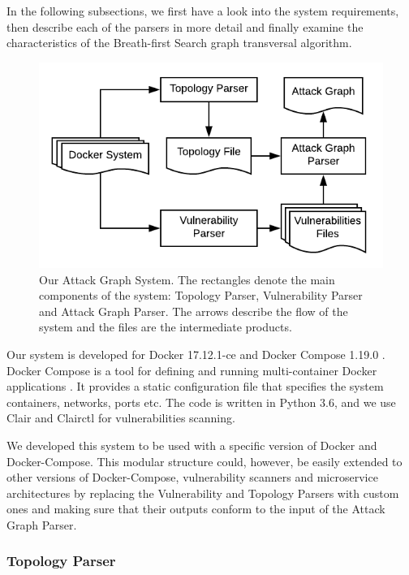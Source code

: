 In the following subsections, we first have a look into the system requirements, then describe each of the parsers in more detail and finally examine the characteristics of the Breath-first Search graph transversal algorithm.

\begin{figure}
	\includegraphics[scale=0.9]{./images/AttackGraphSystem}
	\caption{Our Attack Graph System. The rectangles denote the main components of the system: Topology Parser, Vulnerability Parser and Attack Graph Parser. The arrows describe the flow of the system and the files are the intermediate products.}
	\label{AttackGraphSystem}
\end{figure}

Our system is developed for Docker 17.12.1-ce and Docker Compose 1.19.0 \cite{merkel2014docker}. Docker Compose is a tool for defining and running multi-container Docker applications \cite{dockercompose}. It provides a static configuration file that specifies the system containers, networks, ports etc. The code is written in Python 3.6, and we use Clair \cite{clair} and Clairctl \cite{clairctl} for vulnerabilities scanning.

We developed this system to be used with a specific version of Docker and Docker-Compose. This modular structure could, however, be easily extended to other versions of Docker-Compose, vulnerability scanners and microservice architectures by replacing the Vulnerability and Topology Parsers with custom ones and making sure that their outputs conform to the input of the Attack Graph Parser.

\subsubsection{Topology Parser}
\label{chap:topology_p}

